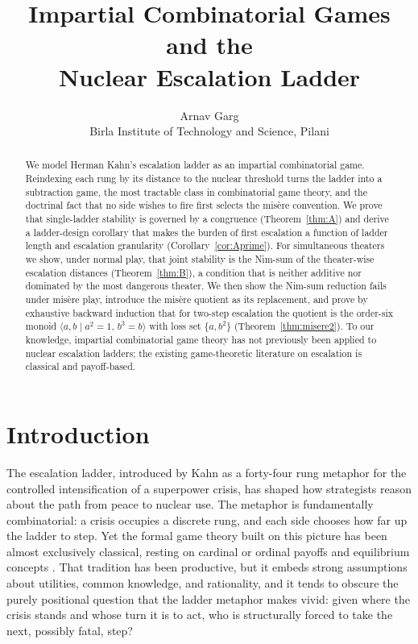 \documentclass[11pt]{article}
\title{Impartial Combinatorial Games and the\\ Nuclear Escalation Ladder}
\author{Arnav Garg\\ \small Birla Institute of Technology and Science, Pilani}
\date{}
\theoremstyle{plain}
\theoremstyle{definition}
\theoremstyle{remark}
\begin{document}
\maketitle

\begin{abstract}
We model Herman Kahn's escalation ladder as an impartial combinatorial game.
Reindexing each rung by its distance to the nuclear threshold turns the
ladder into a subtraction game, the most tractable class in combinatorial
game theory, and the doctrinal fact that no side wishes to fire first selects
the mis\`ere convention. We prove that single-ladder stability is governed by
a congruence (Theorem~\ref{thm:A}) and derive a ladder-design corollary that
makes the burden of first escalation a function of ladder length and
escalation granularity (Corollary~\ref{cor:Aprime}). For simultaneous
theaters we show, under normal play, that joint stability is the Nim-sum of
the theater-wise escalation distances (Theorem~\ref{thm:B}), a condition that
is neither additive nor dominated by the most dangerous theater. We then show
the Nim-sum reduction fails under mis\`ere play, introduce the mis\`ere
quotient as its replacement, and prove by exhaustive backward induction that
for two-step escalation the quotient is the order-six monoid
$\langle a,b\mid a^2=1,\,b^3=b\rangle$ with loss set $\{a,b^2\}$
(Theorem~\ref{thm:misere2}). To our knowledge, impartial combinatorial game
theory has not previously been applied to nuclear escalation ladders; the
existing game-theoretic literature on escalation is classical and
payoff-based.
\end{abstract}

\section{Introduction}\label{sec:intro}

The escalation ladder, introduced by Kahn \citep{kahn1965} as a forty-four
rung metaphor for the controlled intensification of a superpower crisis, has
shaped how strategists reason about the path from peace to nuclear use. The
metaphor is fundamentally combinatorial: a crisis occupies a discrete rung,
and each side chooses how far up the ladder to step. Yet the formal game
theory built on this picture has been almost exclusively classical, resting
on cardinal or ordinal payoffs and equilibrium concepts
\citep{schelling1960, schelling1966, powell1990, brams1985}. That tradition
has been productive, but it embeds strong assumptions about utilities,
common knowledge, and rationality, and it tends to obscure the purely
positional question that the ladder metaphor makes vivid: given where the
crisis stands and whose turn it is to act, who is structurally forced to
take the next, possibly fatal, step?
\end{document}
